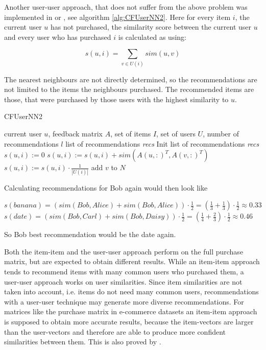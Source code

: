 \documentclass[10pt]{reportMaster}
\begin{document}
Another user-user approach, that does not suffer from the above problem was implemented in \cite{efficientTopN} or \cite{effectiveLatentModels}, see algorithm \ref{alg:CFUserNN2}.
Here for every item $i$, the current user $u$ has not purchased, the similarity score between the current user $u$ and every user who has purchased $i$ is calculated as using: 

\begin{equation}
	s(u,i) = \sum_{v \in U(i)}{sim(u,v)}
\end{equation}

The nearest neighbours are not directly determined, so the recommendations are not limited to the items the neighbours purchased.
The recommended items are those, that were purchased by those users with the highest similarity to $u$.

\begin{algorithm}
	\caption{CFUserNN2}
	\label{alg:CFUserNN2}
	\begin{algorithmic}[1]
		\Require current user $u$, feedback matrix $A$, set of items $I$, set of users $U$, number of recommendations $l$
		\Ensure list of recommendations \textit{recs}
		\State Init list of recommendations \textit{recs}
			\State $s(u,i) := 0$
				\State $s(u,i) := s(u,i) + sim(A(u,:)^T, A(v,:)^T)$
			\EndFor
			\State $s(u,i) := s(u,i) \cdot \frac{1}{|U(i)|}$
				\State add $v$ to $N$
			\EndIf
		\EndFor
	\end{algorithmic}	
\end{algorithm}

Calculating recommendations for Bob again would then look like

$s(banana) = (sim(Bob, Alice) + sim(Bob, Alice)) \cdot \frac{1}{2} = (\frac{1}{3} + \frac{1}{3}) \cdot \frac{1}{2} \approx 0.33$
$s(date) = (sim(Bob, Carl) + sim(Bob, Daisy)) \cdot \frac{1}{2} = (\frac{1}{4} + \frac{2}{3}) \cdot \frac{1}{2} \approx 0.46$

So Bob best recommendation would be the date again.

Both the item-item and the user-user approach perform on the full purchase matrix, but are expected to obtain different results.
While an item-item approach tends to recommend items with many common users who purchased them, a user-user approach works on user similarities.
Since item similarities are not taken into account, i.e. items do not need many common users, recommendations with a user-user technique may generate more diverse recommendations.
For matrices like the purchase matrix in e-commerce datasets an item-item approach is supposed to obtain more accurate results, because the item-vectors are larger than the user-vectors and therefore are able to produce more confident similarities between them.
This is also proved by \cite{itemItemAlgorithms}. 
\end{document}
